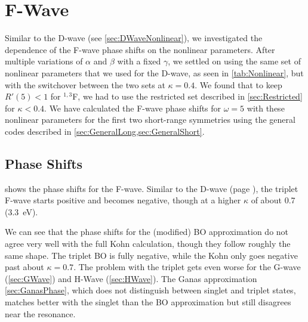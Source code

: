 \documentclass[Dissertation.tex]{subfiles}
\begin{document}
\section{F-Wave}
\label{sec:FWave}

Similar to the D-wave (see \cref{sec:DWaveNonlinear}), we investigated the
dependence of the F-wave phase shifts on the nonlinear parameters.
After multiple variations of $\alpha$ and
$\beta$ with a fixed $\gamma$, we settled on using the same set of nonlinear
parameters that we used for the D-wave, as seen in \cref{tab:Nonlinear}, but
with the switchover between the two sets at $\kappa = 0.4$.
We found that to keep $R'(5) < 1$ for $^{1,3}$F, we had to use the 
restricted set described in \cref{sec:Restricted} for $\kappa < 0.4$.
We have calculated the F-wave phase shifts for $\omega = 5$ with these nonlinear
parameters for the first two short-range symmetries using the general codes
described in \cref{sec:GeneralLong,sec:GeneralShort}.

\label{sec:FNonlinear}

\subsection{Phase Shifts}
\label{sec:FWavePhase}

 shows the phase shifts for the F-wave.
Similar to the D-wave (page \pageref{DWaveSwitch}), the triplet F-wave starts
positive and becomes negative, though at a higher $\kappa$ of about 0.7
(\SI{3.3}{eV}).

We can see that the phase shifts for the (modified) BO approximation do not 
agree very well with the full Kohn calculation, though they follow roughly 
the same shape. The triplet BO is fully negative, while the Kohn only goes 
negative past about $\kappa = 0.7$. The problem with the triplet gets even 
worse for the G-wave (\cref{sec:GWave}) and H-Wave (\cref{sec:HWave}).
The Ganas approximation \cref{sec:GanasPhase}, which does not distinguish
between singlet and triplet states, matches better with the singlet than the
BO approximation but still disagrees near the resonance.
\end{document}
